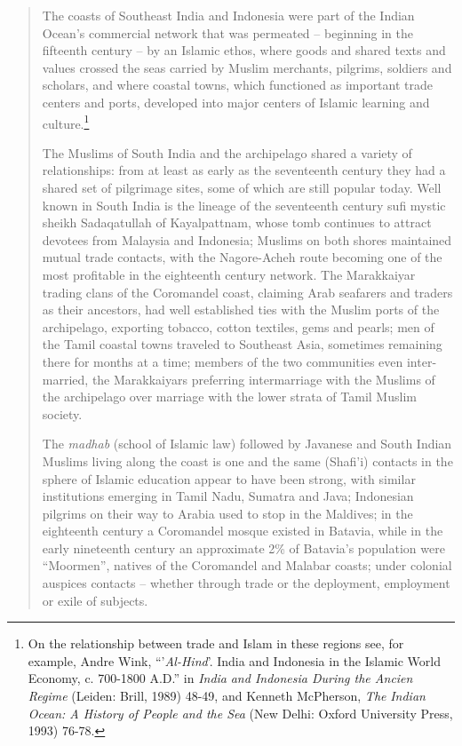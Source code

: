 \begin{quote}
 The coasts of Southeast India and Indonesia were part of the Indian Ocean's commercial network that was permeated -- beginning in the fifteenth century -- by an Islamic ethos, where goods and shared texts and values crossed the seas carried by Muslim merchants, pilgrims, soldiers and scholars, and where coastal towns, which functioned as important trade centers and ports, developed into major centers of Islamic learning and culture.\footnote{On
  the relationship between trade and Islam in these regions see, for example, Andre Wink, {\textquotedblleft}'\textit{Al-Hind}'. India and Indonesia in the Islamic World Economy, c. 700-1800 A.D.{\textquotedblright} in \textit{India} \textit{and Indonesia During the Ancien Regime }(Leiden: Brill, 1989) 48-49, and Kenneth McPherson, \textit{The} \textit{Indian Ocean: A History of People and the Sea }(New Delhi: Oxford University Press, 1993) 76-78.
}

The Muslims of South India and the archipelago shared a variety of relationships: from at least as early as the seventeenth century they had a shared set of pilgrimage sites, some of which are still popular today. Well known in South India is the lineage of the seventeenth century sufi mystic sheikh Sadaqatullah of Kayalpattnam, whose tomb continues to attract devotees from Malaysia and Indonesia; Muslims on both shores maintained mutual trade contacts, with the Nagore-Acheh route becoming one of the most profitable in the eighteenth century network. The Marakkaiyar trading clans of the Coromandel coast, claiming Arab seafarers and traders as their ancestors, had well established ties with the Muslim ports of the archipelago, exporting tobacco, cotton textiles, gems and pearls; men of the Tamil coastal towns traveled to Southeast Asia, sometimes remaining there for months at a time; members of the two communities even inter-married, the Marakkaiyars preferring intermarriage with the Muslims of the archipelago over marriage with the lower strata of Tamil Muslim society.

The \textit{madhab} (school of Islamic law) followed by Javanese and South Indian Muslims living along the coast is one and the same (Shafi'i) contacts in the sphere of Islamic education appear to have been strong, with similar institutions emerging in Tamil Nadu, Sumatra and Java; Indonesian pilgrims on their way to Arabia used to stop in the Maldives; in the eighteenth century a Coromandel mosque existed in Batavia, while in the early nineteenth century an approximate 2\% of Batavia's population were {\textquotedblleft}Moormen{\textquotedblright}, natives of the Coromandel and Malabar coasts; under colonial auspices contacts  {}-- whether through trade or the deployment, employment or exile of subjects. 
\citep[12-13]{Ricci2006}
\end{quote}

